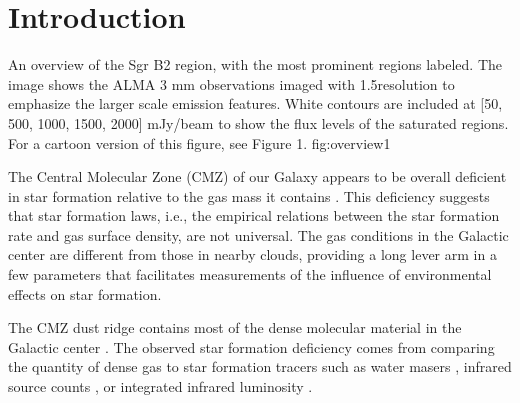 \documentclass[twocolumn]{aastex61}
\begin{document}



\section{Introduction}

{An overview of the Sgr B2 region, with the most prominent regions labeled.
The image shows the ALMA 3 mm observations imaged with 1.5\arcsec resolution
to emphasize the larger scale emission features.  White contours
are included at [50, 500, 1000, 1500, 2000] mJy/beam to show the flux levels
of the saturated regions.  For a cartoon version of this
figure, see \citet{Schmiedeke2016a} Figure 1.}
{fig:overview}{1}{\textwidth}

The Central Molecular Zone (CMZ) of our Galaxy appears to be overall deficient
in star formation relative to the gas mass it contains
\citep{Guesten1983b,Morris1996a,Beuther2012a,Immer2012a,Longmore2013a,
Kauffmann2017c,Kauffmann2017b,Barnes2017b}.  This deficiency
suggests that star formation laws, i.e., the empirical relations between
the star formation rate and gas surface density, are not universal.  The gas
conditions in the Galactic center are different from those in nearby clouds,
providing a long lever arm in a few
parameters \citep[e.g., pressure, temperature, velocity
dispersion;
][]{Kruijssen2013a,Ginsburg2016a,Immer2016a,Shetty2012a,Henshaw2016a} that
facilitates measurements of the influence of environmental effects on star
formation.

The CMZ dust ridge contains most of the dense molecular material in the
Galactic center \citep{Lis1999a,Bally2010a,Molinari2011a}.  The observed star
formation deficiency comes from comparing the quantity of dense gas to  star
formation tracers such as water masers \citep{Longmore2013a}, infrared source
counts \citep{Yusef-Zadeh2009a}, or integrated infrared luminosity
\citep{Barnes2017b}. 
\end{document}
